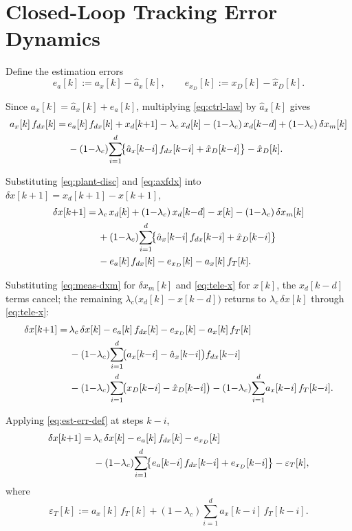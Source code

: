 \documentclass[11pt,a4paper]{ctexart}
\newcommand{\lc}{\lambda_c}
\newcommand{\fdx}{f_{dx}}
\newcommand{\fT}{f_T}
\newcommand{\dx}{\delta x}
\newcommand{\dxm}{\delta x_m}
\newcommand{\xD}{x_D}
\newcommand{\ax}{a_x}
\newcommand{\axhat}{\hat a_x}
\newcommand{\xDhat}{\hat x_D}
\newcommand{\ea}{e_{a}}
\newcommand{\exD}{e_{x_D}}
\newcommand{\epsT}{\varepsilon_T}
\begin{document}
\section{Closed-Loop Tracking Error Dynamics}
\label{sec:trk}

Define the estimation errors
\begin{equation}
\ea[k] := \ax[k] - \axhat[k], \qquad
\exD[k] := \xD[k] - \xDhat[k].
\label{eq:est-err-def}
\end{equation}

Since $\ax[k] = \axhat[k] + \ea[k]$, multiplying \eqref{eq:ctrl-law} by $\axhat[k]$ gives
\begin{align}
\ax[k]\,\fdx[k] = \,& \ea[k]\,\fdx[k] + x_d[k{+}1] - \lc\,x_d[k] - (1{-}\lc)\,x_d[k{-}d] + (1{-}\lc)\,\dxm[k] \notag\\
& - (1{-}\lc)\!\sum_{i=1}^{d}\!\bigl\{\axhat[k{-}i]\,\fdx[k{-}i] + \xDhat[k{-}i]\bigr\} - \xDhat[k].
\label{eq:axfdx}
\end{align}

Substituting \eqref{eq:plant-disc} and \eqref{eq:axfdx} into $\dx[k{+}1] = x_d[k{+}1] - x[k{+}1]$,
\begin{align}
\dx[k{+}1] = \,& \lc\,x_d[k] + (1{-}\lc)\,x_d[k{-}d] - x[k] - (1{-}\lc)\,\dxm[k] \notag\\
& + (1{-}\lc)\!\sum_{i=1}^{d}\!\bigl\{\axhat[k{-}i]\,\fdx[k{-}i] + \xDhat[k{-}i]\bigr\} \notag\\
& - \ea[k]\,\fdx[k] - \exD[k] - \ax[k]\,\fT[k].
\label{eq:substitute}
\end{align}

Substituting \eqref{eq:meas-dxm} for $\dxm[k]$ and \eqref{eq:tele-x} for $x[k]$, the $x_d[k{-}d]$ terms cancel; the remaining $\lc\bigl(x_d[k]-x[k{-}d]\bigr)$ returns to $\lc\,\dx[k]$ through \eqref{eq:tele-x}:
\begin{align}
\dx[k{+}1] = \,& \lc\,\dx[k] - \ea[k]\,\fdx[k] - \exD[k] - \ax[k]\,\fT[k] \notag\\
& - (1{-}\lc)\!\sum_{i=1}^{d}\!\bigl(\ax[k{-}i] - \axhat[k{-}i]\bigr)\fdx[k{-}i] \notag\\
& - (1{-}\lc)\!\sum_{i=1}^{d}\!\bigl(\xD[k{-}i] - \xDhat[k{-}i]\bigr)
  - (1{-}\lc)\!\sum_{i=1}^{d}\!\ax[k{-}i]\,\fT[k{-}i].
\label{eq:collect}
\end{align}

Applying \eqref{eq:est-err-def} at steps $k{-}i$,
\begin{align}
\dx[k{+}1] = \,& \lc\,\dx[k] - \ea[k]\,\fdx[k] - \exD[k] \notag\\
& - (1{-}\lc)\!\sum_{i=1}^{d}\!\bigl\{\ea[k{-}i]\,\fdx[k{-}i] + \exD[k{-}i]\bigr\} - \epsT[k],
\label{eq:closed-loop}
\end{align}
where
\begin{equation}
\epsT[k] := \ax[k]\,\fT[k] + (1{-}\lc)\!\sum_{i=1}^{d}\!\ax[k{-}i]\,\fT[k{-}i].
\label{eq:eps-T}
\end{equation}
\end{document}
